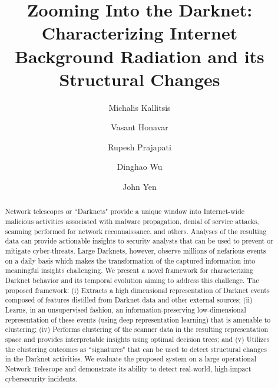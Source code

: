 \documentclass[manuscript, nonacm]{acmart}
\begin{document}
\title{Zooming Into the Darknet: 
Characterizing Internet Background Radiation and its Structural Changes}


\author{Michalis Kallitsis}

\author{Vasant Honavar}

\author{Rupesh Prajapati}

\author{Dinghao Wu}

\author{John Yen}

\maketitle

\begin{abstract}
Network telescopes or ``Darknets" provide a unique window into Internet-wide malicious 
activities associated with 
malware propagation, denial of service attacks,  
scanning performed for network reconnaissance, and others. 
Analyses of the resulting data can 
provide actionable insights to security analysts that can be used to 
prevent or mitigate cyber-threats. 
Large Darknets, however, observe millions of nefarious events
on a daily basis which makes the transformation of the captured 
information into meaningful insights challenging. 
We present a novel framework for characterizing Darknet behavior
and its temporal evolution aiming to address this challenge. 
The proposed framework: (i) Extracts a high dimensional representation of Darknet
events composed of features distilled from Darknet data and other external sources; 
(ii) Learns, in an unsupervised fashion, 
an information-preserving low-dimensional representation of these events 
(using deep representation learning) that is amenable to clustering; 
(iv) Performs clustering of the scanner data in the resulting representation space
and provides interpretable insights using optimal decision trees; and
(v) Utilizes the clustering outcomes as ``signatures" that can be used
to detect structural changes in the Darknet activities. We evaluate the proposed
system on a large operational Network Telescope and demonstrate its ability
to detect real-world, high-impact cybersecurity incidents. 
\end{abstract}
\end{document}
